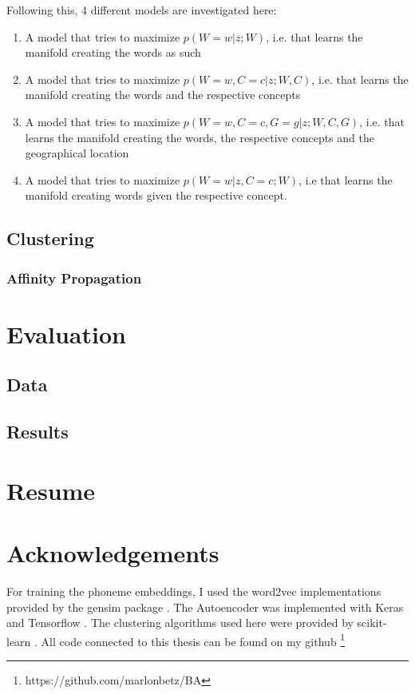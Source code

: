 \documentclass[8pt]{article}
\begin{document}
Following this, 4 different models are investigated here:
\begin{enumerate}
\item A model that tries to maximize $p(W=w|z;W)$, i.e. that learns the manifold creating the words as such
\item A model that tries to maximize $p(W=w,C=c|z;W,C)$, i.e. that learns the manifold creating the words and the respective concepts
\item A model that tries to maximize $p(W=w,C=c,G=g|z;W,C,G)$, i.e. that learns the manifold creating the words, the respective concepts and the geographical location
\item A model that tries to maximize $p(W=w|z,C=c;W)$, i.e that learns the manifold creating words given the respective concept.
\end{enumerate}

\subsection{Clustering}
\subsubsection{Affinity Propagation}
\section{Evaluation}
\subsection{Data}
\subsection{Results}
\section{Resume}
\section{Acknowledgements}
For training the phoneme embeddings, I used the word2vec implementations provided by the gensim package \cite{rehurek_lrec}. The Autoencoder was implemented with Keras \cite{chollet2015keras} and Tensorflow \cite{tensorflow2015-whitepaper}. The clustering algorithms used here were provided by scikit-learn \cite{scikit-learn}. All code connected to this thesis can be found on my github \footnote{https://github.com/marlonbetz/BA}




\end{document}
